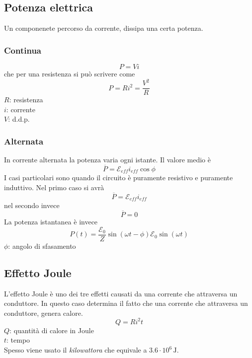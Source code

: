 \subsection{Potenza elettrica}
Un componenete percorso da corrente, dissipa una certa potenza.
\subsubsection{Continua}
\begin{equation*}
  P = Vi
\end{equation*}
che per una resistenza si può scrivere come
\begin{equation*}
  P = Ri^2 = \frac{V^2}{R}
\end{equation*}
$R$: resistenza\\
$i$: corrente\\
$V$: d.d.p.
\subsubsection{Alternata}
In corrente alternata la potenza varia ogni istante. Il valore medio è
\begin{equation*}
  \overline{P} = \mathcal{E}_{eff}i_{eff}\cos\phi
\end{equation*}
I casi particolari sono quando il circuito è puramente resistivo e puramente induttivo. Nel primo
caso si avrà
\begin{equation*}
  \overline{P} = \mathcal{E}_{eff}i_{eff}
\end{equation*}
nel secondo invece
\begin{equation*}
  \overline{P} = 0
\end{equation*}
La potenza istantanea è invece
\begin{equation*}
  P(t) = \frac{\mathcal{E}_0}{Z}\sin(\omega t - \phi) \mathcal{E}_0\sin(\omega t) 
\end{equation*}
$\phi$: angolo di sfasamento
\subsection{Effetto Joule}
L'effetto Joule è uno dei tre effetti causati da una corrente che attraversa un conduttore. 
In questo caso determina il fatto che una corrente che attraversa un conduttore, genera calore.
\begin{equation*}
  Q = Ri^2t
\end{equation*}
$Q$: quantità di calore in Joule\\
$t$: tempo\\ [\baselineskip]
Spesso viene usato il \emph{kilowattora} che equivale a $3.6\cdot10^6\,\text{J}$.
